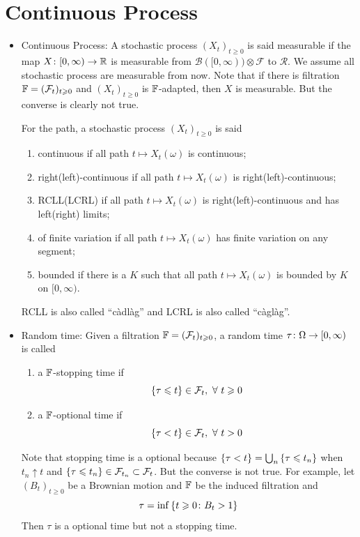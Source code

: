 \documentclass[a4paper,12pt]{article}
\begin{document}
\section{Continuous Process}
\begin{itemize}
  \item Continuous Process: A stochastic process $(X_t)_{t \geqslant 0}$ is said measurable if the map $X \colon [0,\infty) \time \Omega \sto \R$ is measurable from $\mathcal{B}([0,\infty)) \otimes \mathcal{F}$ to $\mathcal{R}$. We assume all stochastic process are measurable from now. Note that if there is filtration $\mathbb{F} = (\mathcal{F}_t)_{t \geqslant 0}$ and $(X_t)_{t \geqslant 0}$ is $\mathbb{F}$-adapted, then $X$ is measurable. But the converse is clearly not true.

  \noindent For the path, a stochastic process $(X_t)_{t \geqslant 0}$ is said
  \begin{enumerate}[label=(\arabic*)]
    \item continuous if all path $t \mapsto X_t(\omega)$ is continuous;
    \item right(left)-continuous if all path $t \mapsto X_t(\omega)$ is right(left)-continuous;
    \item RCLL(LCRL) if all path $t \mapsto X_t(\omega)$ is right(left)-continuous and has left(right) limits;
    \item of finite variation if all path $t \mapsto X_t(\omega)$ has finite variation on any segment;
    \item bounded if there is a $K$ such that all path $t \mapsto X_t(\omega)$ is bounded by $K$ on $[0,\infty)$.
  \end{enumerate}
  \begin{rmk}
    RCLL is also called ``c\`adl\`ag'' and LCRL is also called ``c\`agl\`ag''.
  \end{rmk}

  \item Random time: Given a filtration $\mathbb{F} =(\mathcal{F}_t)_{t\geqslant 0}$, a random time $\tau \colon \Omega \rightarrow [0,\infty)$ is called
  \begin{enumerate}[label=(\arabic*)]
    \item a $\mathbb{F}$-stopping time if
    \begin{equation*}
      \left\{\tau \leqslant t\right\} \in \mathcal{F}_t,~\forall~t\geqslant 0
    \end{equation*}
    \item a $\mathbb{F}$-optional time if
    \begin{equation*}
      \left\{\tau < t\right\} \in \mathcal{F}_t,~\forall~t > 0
    \end{equation*}
  \end{enumerate}
  Note that stopping time is a optional because $\left\{\tau < t\right\} = \bigcup_n\left\{\tau \leqslant t_n\right\}$ when $t_n\uparrow t$ and $\left\{\tau \leqslant t_n\right\} \in \mathcal{F}_{t_n} \subset \mathcal{F}_t$. But the converse is not true. For example, let $(B_t)_{t\geqslant 0}$ be a Brownian motion and $\mathbb{F}$ be the induced filtration and
  \begin{equation*}
    \tau = \inf\left\{t \geqslant 0 \colon B_t > 1\right\}
  \end{equation*}
  Then $\tau$ is a optional time but not a stopping time.


\end{itemize}
\end{document}
